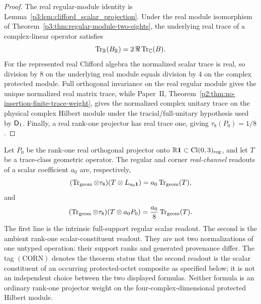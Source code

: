 \documentclass[12pt,a4paper]{article}
\begin{document}
\begin{proof}
The real regular-module identity is
Lemma~\ref{p3:lem:clifford_scalar_projection}.  Under the real module
isomorphism of Theorem~\ref{p3:thm:regular-module-two-eights}, the underlying
real trace of a complex-linear operator satisfies
\[
 \operatorname{Tr}_{\mathbb R}(B_{\mathbb R})
 =2\,\Re\operatorname{Tr}_{\mathbb C}(B).
\]
For the represented real Clifford algebra the normalized scalar trace is real,
so division by \(8\) on the underlying real module equals division by \(4\)
on the complex protected module.  Full orthogonal invariance on the real
regular module gives the unique normalized real matrix trace, while Paper~II,
Theorem~\ref{p2:thm:no-insertion-finite-trace-weight}, gives the normalized
complex unitary trace on the physical complex Hilbert module under the
tracial/full-unitary hypothesis used by \(\mathsf{D}_1\).  Finally, a real rank-one
projector has real trace one, giving \(\tau_8(P_0)=1/8\).
\end{proof}

\begin{definition}
\label{p3:def:scalar-corner-readout}
Let \(P_0\) be the rank-one real orthogonal projector onto
\(\mathbb R\mathbf1\subset\operatorname{Cl}(0,3)_{\rm reg}\), and let \(T\) be a
trace-class geometric operator.  The regular and corner \emph{real-channel}
readouts of a scalar coefficient \(a_0\) are, respectively,
\[
 (\operatorname{Tr}_{\rm geom}\otimes\tau_8)
   (T\otimes L_{a_0\mathbf1})
 =a_0\operatorname{Tr}_{\rm geom}(T),
\]
and
\[
 (\operatorname{Tr}_{\rm geom}\otimes\tau_8)
   (T\otimes a_0P_0)
 =\frac{a_0}{8}\operatorname{Tr}_{\rm geom}(T).
\]
The first line is the intrinsic full-support regular scalar readout.  The
second is the ambient rank-one scalar-constituent readout.  They are not two
normalizations of one untyped operation: their support ranks and generated
provenance differ.  The tag \((\mathrm{CORN})\) denotes the theorem status that
the second readout is the scalar constituent of an occurring protected-octet
composite as specified below; it is not an independent choice between the two
displayed formulas.  Neither formula is an ordinary rank-one projector weight
on the four-complex-dimensional protected Hilbert module.
\end{definition}
\end{document}
